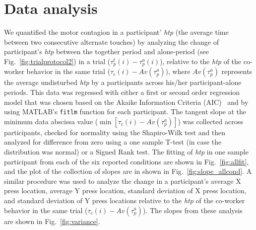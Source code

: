 \documentclass[a4paper, 12pt, oneside]{Thesis}  %
\begin{document}
\section{Data analysis} \label{data_analysis}

We quantified the motor contagion in a participant' {\it htp} (the average time between two consecutive alternate touches) by analyzing the change of participant's {\it htp} between the together period and alone-period (see Fig.~\ref{fig:trialprotocol2}) in a trial ($\tau_p^t(i)-\tau_p^a(i)$), relative to the {\it htp} of the co-worker behavior in the same trial ($\tau_c (i)-Av(\tau_p^a)$), where $Av(\tau_p^a)$ represents the average undisturbed {\it htp} by a participants across his/her participant-alone periods. This data was regressed with either a first or second order regression model that was chosen based on the Akaike Information Criteria (AIC)~\cite{Akaike:ISIT:1973} and by using MATLAB's {\tt fitlm} function for each participant. The tangent slope at the minimum data abscissa value ($\min[\tau_c(i)-Av(\tau_p^a)]$) was collected across participants, checked for normality using the Shapiro-Wilk test and then analyzed for difference from zero using a one sample T-test (in case the distribution was normal) or a Signed Rank test. The fitting of {\it htp} in one sample participant from each of the six reported conditions are shown in Fig.~\ref{fig:allfit}, and the plot of the collection of slopes are in shown in Fig.~\ref{fig:slope_allcond}. A similar procedure was used to analyze the change in a participant's average X press location, average Y press location, standard deviation of X press location, and standard deviation of Y press locations relative to the {\it htp} of the co-worker behavior in the same trial ($\tau_c(i)-Av(\tau_p^a)$). The slopes from these analysis are shown in Fig.~\ref{fig:variance}.
\end{document}
